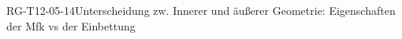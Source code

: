 
\begin{REM}{RG-T12-05-14}{Unterscheidung zw. Innerer und äußerer Geometrie: Eigenschaften der Mfk vs der Einbettung}
\end{REM}
